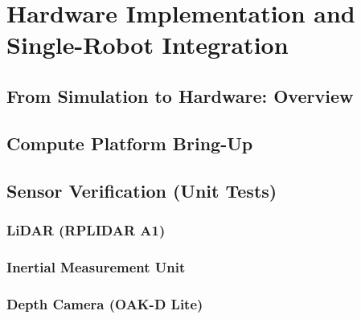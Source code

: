 
\chapter{Hardware Implementation and Single-Robot Integration}
\label{chap:hardware}


\section{From Simulation to Hardware: Overview}
\label{sec:sim_to_hw_overview}

\section{Compute Platform Bring-Up}
\label{sec:compute_bringup}

\section{Sensor Verification (Unit Tests)}
\label{sec:sensor_verification}

\subsection{LiDAR (RPLIDAR A1)}
\label{subsec:hw_lidar_test}

\subsection{Inertial Measurement Unit}
\label{subsec:hw_imu_test}

\subsection{Depth Camera (OAK-D Lite)}
\label{subsec:hw_camera_test}

